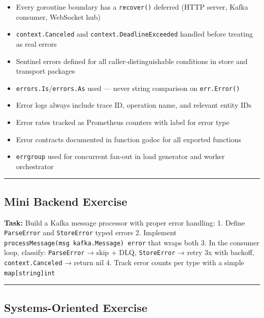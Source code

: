 \documentclass[11pt,openany]{book}
\providecommand{\tightlist}{%
  \setlength{\itemsep}{0pt}\setlength{\parskip}{0pt}}
\begin{document}
\begin{itemize}
\tightlist
\item[$\square$]
  Every goroutine boundary has a \texttt{recover()} deferred (HTTP
  server, Kafka consumer, WebSocket hub)
\item[$\square$]
  \texttt{context.Canceled} and \texttt{context.DeadlineExceeded}
  handled before treating as real errors
\item[$\square$]
  Sentinel errors defined for all caller-distinguishable conditions in
  store and transport packages
\item[$\square$]
  \texttt{errors.Is}/\texttt{errors.As} used --- never string comparison
  on \texttt{err.Error()}
\item[$\square$]
  Error logs always include trace ID, operation name, and relevant
  entity IDs
\item[$\square$]
  Error rates tracked as Prometheus counters with label for error type
\item[$\square$]
  Error contracts documented in function godoc for all exported
  functions
\item[$\square$]
  \texttt{errgroup} used for concurrent fan-out in load generator and
  worker orchestrator
\end{itemize}

\begin{center}\rule{0.5\linewidth}{0.5pt}\end{center}

\hypertarget{mini-backend-exercise-3}{%
\subsection{Mini Backend Exercise}\label{mini-backend-exercise-3}}

\textbf{Task:} Build a Kafka message processor with proper error
handling: 1. Define \texttt{ParseError} and \texttt{StoreError} typed
errors 2. Implement \texttt{processMessage(msg\ kafka.Message)\ error}
that wraps both 3. In the consumer loop, classify: \texttt{ParseError} →
skip + DLQ, \texttt{StoreError} → retry 3x with backoff,
\texttt{context.Canceled} → return nil 4. Track error counts per type
with a simple \texttt{map{[}string{]}int}

\begin{center}\rule{0.5\linewidth}{0.5pt}\end{center}

\hypertarget{systems-oriented-exercise-3}{%
\subsection{Systems-Oriented
Exercise}\label{systems-oriented-exercise-3}}
\end{document}
